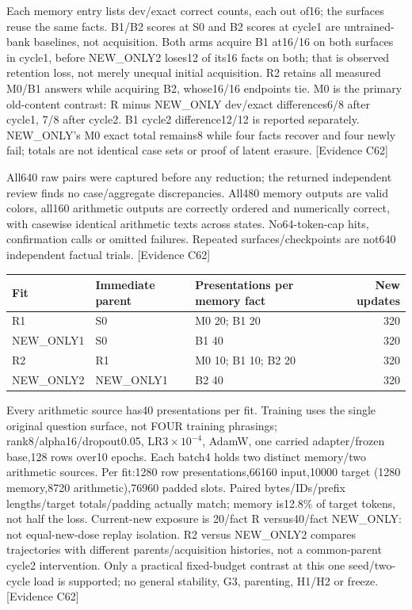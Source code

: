 \documentclass[11pt]{article}
\newcommand{\ev}[1]{\textsf{[Evidence #1]}}
\begin{document}
Each memory entry lists dev/exact correct counts, each out of16; the surfaces
reuse the same facts. B1/B2 scores at S0 and B2 scores at cycle1 are untrained-bank
baselines, not acquisition. Both arms acquire B1 at16/16 on both surfaces in
cycle1, before NEW\_ONLY2 loses12 of its16 facts on both; that is observed
retention loss, not merely unequal initial acquisition. R2 retains all measured
M0/B1 answers while acquiring B2, whose16/16 endpoints tie. M0 is the primary
old-content contrast: R minus NEW\_ONLY dev/exact differences6/8 after cycle1,
7/8 after cycle2. B1 cycle2 difference12/12 is reported separately. NEW\_ONLY's
M0 exact total remains8 while four facts recover and four newly fail; totals
are not identical case sets or proof of latent erasure. \ev{C62}

All640 raw pairs were captured before any reduction; the returned independent
review finds no case/aggregate discrepancies. All480 memory outputs are valid
colors, all160 arithmetic outputs are correctly ordered and numerically correct,
with casewise identical arithmetic texts across states. No64-token-cap hits,
confirmation calls or omitted failures. Repeated surfaces/checkpoints are not640
independent factual trials. \ev{C62}

\begin{center}
\begin{tabular}{lllr}
\toprule
Fit & Immediate parent & Presentations per memory fact & New updates \\
\midrule
R1 & S0 & M0 20; B1 20 & 320 \\
NEW\_ONLY1 & S0 & B1 40 & 320 \\
R2 & R1 & M0 10; B1 10; B2 20 & 320 \\
NEW\_ONLY2 & NEW\_ONLY1 & B2 40 & 320 \\
\bottomrule
\end{tabular}
\end{center}

Every arithmetic source has40 presentations per fit. Training uses the single
original question surface, not FOUR training phrasings; rank8/alpha16/dropout0.05,
LR$3\times10^{-4}$, AdamW, one carried adapter/frozen base,128 rows over10 epochs.
Each batch4 holds two distinct memory/two arithmetic sources. Per fit:1280 row
presentations,66160 input,10000 target (1280 memory,8720 arithmetic),76960 padded
slots. Paired bytes/IDs/prefix lengths/target totals/padding actually match;
memory is12.8\% of target tokens, not half the loss. Current-new exposure is
20/fact R versus40/fact NEW\_ONLY: not equal-new-dose replay isolation. R2 versus
NEW\_ONLY2 compares trajectories with different parents/acquisition histories,
not a common-parent cycle2 intervention. Only a practical fixed-budget contrast
at this one seed/two-cycle load is supported; no general stability, G3, parenting,
H1/H2 or freeze. \ev{C62}
\end{document}
